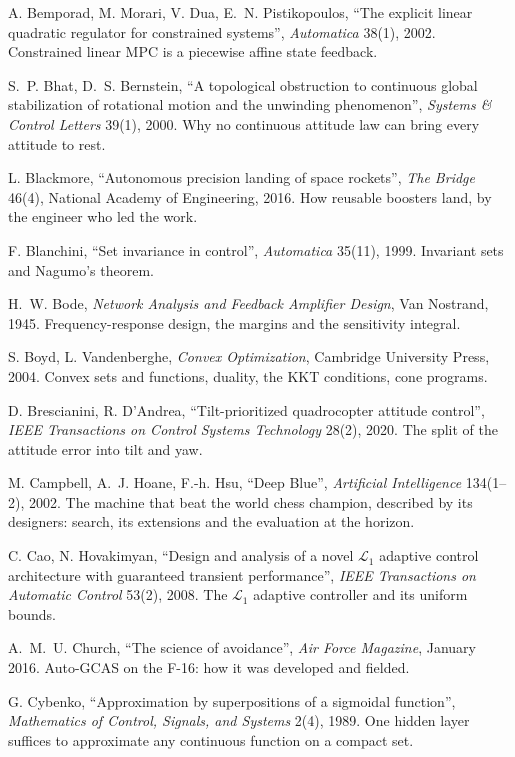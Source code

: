 \begin{description}[leftmargin=1.5em, itemindent=-1.5em, itemsep=5pt, font=\normalfont]
  \item[] A. Bemporad, M. Morari, V. Dua, E.~N. Pistikopoulos, \enquote{The explicit linear quadratic regulator for constrained systems}, \emph{Automatica} 38(1), 2002. Constrained linear MPC is a piecewise affine state feedback.
  \item[] S.~P. Bhat, D.~S. Bernstein, \enquote{A topological obstruction to continuous global stabilization of rotational motion and the unwinding phenomenon}, \emph{Systems \& Control Letters} 39(1), 2000. Why no continuous attitude law can bring every attitude to rest.
  \item[] L. Blackmore, \enquote{Autonomous precision landing of space rockets}, \emph{The Bridge} 46(4), National Academy of Engineering, 2016. How reusable boosters land, by the engineer who led the work.
  \item[] F. Blanchini, \enquote{Set invariance in control}, \emph{Automatica} 35(11), 1999. Invariant sets and Nagumo's theorem.
  \item[] H.~W. Bode, \emph{Network Analysis and Feedback Amplifier Design}, Van Nostrand, 1945. Frequency-response design, the margins and the sensitivity integral.
  \item[] S. Boyd, L. Vandenberghe, \emph{Convex Optimization}, Cambridge University Press, 2004. Convex sets and functions, duality, the KKT conditions, cone programs.
  \item[] D. Brescianini, R. D'Andrea, \enquote{Tilt-prioritized quadrocopter attitude control}, \emph{IEEE Transactions on Control Systems Technology} 28(2), 2020. The split of the attitude error into tilt and yaw.
  \item[] M. Campbell, A.~J. Hoane, F.-h. Hsu, \enquote{Deep Blue}, \emph{Artificial Intelligence} 134(1--2), 2002. The machine that beat the world chess champion, described by its designers: search, its extensions and the evaluation at the horizon.
  \item[] C. Cao, N. Hovakimyan, \enquote{Design and analysis of a novel $\mathcal L_1$ adaptive control architecture with guaranteed transient performance}, \emph{IEEE Transactions on Automatic Control} 53(2), 2008. The $\mathcal L_1$ adaptive controller and its uniform bounds.
  \item[] A.~M.~U. Church, \enquote{The science of avoidance}, \emph{Air Force Magazine}, January 2016. Auto-GCAS on the F-16: how it was developed and fielded.
  \item[] G. Cybenko, \enquote{Approximation by superpositions of a sigmoidal function}, \emph{Mathematics of Control, Signals, and Systems} 2(4), 1989. One hidden layer suffices to approximate any continuous function on a compact set.

\end{description}
